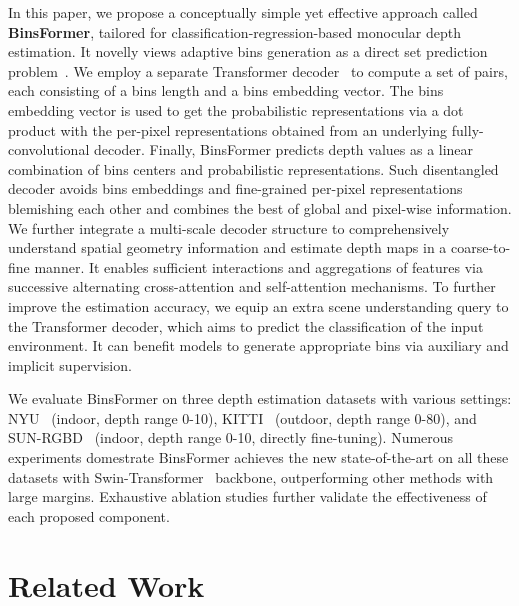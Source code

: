 \documentclass[runningheads]{llncs}
\begin{document}
In this paper, we propose a conceptually simple yet effective approach called \textbf{BinsFormer}, tailored for classification-regression-based monocular depth estimation. It novelly views adaptive bins generation as a direct set prediction problem~\cite{carion2020detr}. We employ a separate Transformer decoder~\cite{dosovitskiy2020vit} to compute a set of pairs, each consisting of a bins length and a bins embedding vector. The bins embedding vector is used to get the probabilistic representations via a dot product with the per-pixel representations obtained from an underlying fully-convolutional decoder. Finally, BinsFormer predicts depth values as a linear combination of bins centers and probabilistic representations. Such disentangled decoder avoids bins embeddings and fine-grained per-pixel representations blemishing each other and combines the best of global and pixel-wise information. We further integrate a multi-scale decoder structure to comprehensively understand spatial geometry information and estimate depth maps in a coarse-to-fine manner. It enables sufficient interactions and aggregations of features via successive alternating cross-attention and self-attention mechanisms. To further improve the estimation accuracy, we equip an extra scene understanding query to the Transformer decoder, which aims to predict the classification of the input environment. It can benefit models to generate appropriate bins via auxiliary and implicit supervision.

We evaluate BinsFormer on three depth estimation datasets with various settings: NYU~\cite{silberman2012nyu} (indoor, depth range 0-10), KITTI~\cite{geiger2013kitti} (outdoor, depth range 0-80), and SUN-RGBD~\cite{song2015sunrgbd} (indoor, depth range 0-10, directly fine-tuning). Numerous experiments domestrate BinsFormer achieves the new state-of-the-art on all these datasets with Swin-Transformer~\cite{liu2021swin} backbone, outperforming other methods with large margins. Exhaustive ablation studies further validate the effectiveness of each proposed component. \section{Related Work} 

\newcommand\etal{\textit{et al.}}
\end{document}
